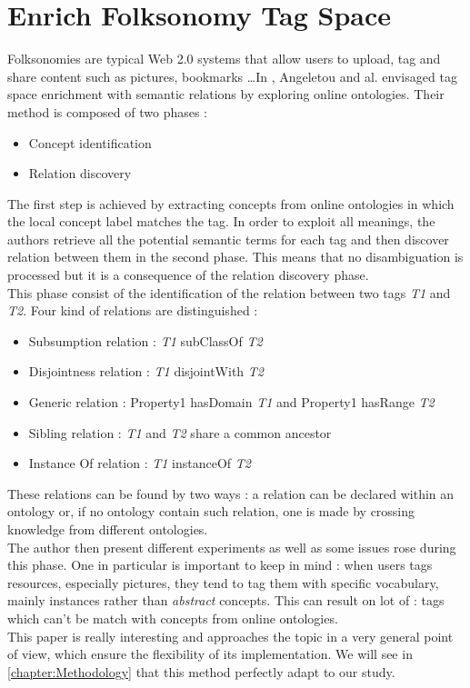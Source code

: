 \section{Enrich Folksonomy Tag Space} %
\label{sec:enrich_folksonomy_tag_space}
Folksonomies are typical Web 2.0 systems that allow users to upload, tag and share content such as pictures, bookmarks \dots In \cite{angeletou2007bridging}, Angeletou and al. envisaged tag space enrichment with semantic relations by exploring online ontologies. Their method is composed of two phases :
\begin{itemize}
	\item Concept identification 
	\item Relation discovery
\end{itemize}
The first step is achieved by extracting concepts from online ontologies in which the local concept label matches the tag. In order to exploit all meanings, the authors retrieve all the potential semantic terms for each tag and then discover relation between them in the second phase. This means that no disambiguation is processed but it is a consequence of the relation discovery phase.\\

This phase consist of the identification of the relation between two tags \emph{T1} and \emph{T2}. Four kind of relations are distinguished :
\begin{itemize}
	\item Subsumption relation : \emph{T1} subClassOf \emph{T2}
	\item Disjointness relation : \emph{T1} disjointWith \emph{T2}
	\item Generic relation : Property1 hasDomain \emph{T1} and Property1 hasRange \emph{T2}
	\item Sibling relation : \emph{T1} and \emph{T2} share a common ancestor
	\item Instance Of relation : \emph{T1} instanceOf \emph{T2}
\end{itemize}
These relations can be found by two ways : a relation can be declared within an ontology or, if no ontology contain such relation, one is made by crossing knowledge from different ontologies.\\

The author then present different experiments as well as some issues rose during this phase. One in particular is important to keep in mind : when users tags resources, especially pictures, they tend to tag them with specific vocabulary, mainly instances rather than \emph{abstract} concepts. This can result on lot of  : tags which can't be match with concepts from online ontologies.\\

This paper is really interesting and approaches the topic in a very general point of view, which ensure the flexibility of its implementation. We will see in \ref{chapter:Methodology} that this method perfectly adapt to our study. 

